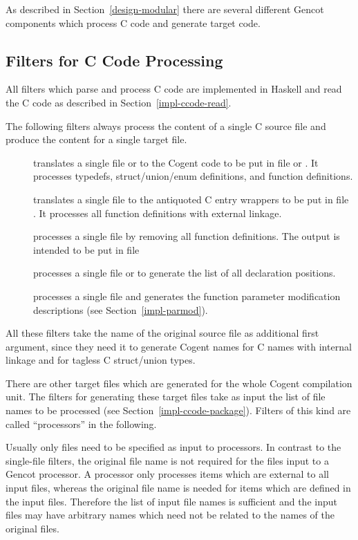 As described in Section~\ref{design-modular} there are several different Gencot components which process C code and generate 
target code.

\subsection{Filters for C Code Processing}
\label{impl-ccomps-filters}

All filters which parse and process C code are implemented in Haskell and read the
C code as described in Section~\ref{impl-ccode-read}.

The following filters always process the content of a single C source file and produce the content for a single 
target file.
\begin{description}
\item[] translates a single file  or  to the Cogent code to be put in file
 or . It processes typedefs, struct/union/enum definitions, and function
definitions. 
\item[] translates a single file  to the antiquoted C entry wrappers to be put in
file . It processes all function definitions with external linkage.
\item[] processes a single file  by removing all function definitions. The output
is intended to be put in file 
\item[] processes a single file  or  to generate the list of
all declaration positions.
\item[] processes a single file  and generates the 
function parameter modification descriptions (see Section~\ref{impl-parmod}).
\end{description}

All these filters take the name of the original source file as additional first
argument, since they need it to generate Cogent names for C names with internal linkage and for tagless C struct/union
types.

There are other target files which are generated for the whole Cogent compilation unit. The filters for generating these target files 
take as input the list of file names to be processed (see Section~\ref{impl-ccode-package}). Filters of this kind 
are called ``processors'' in the following.

Usually only  files need to be specified as input to processors.
In contrast to the single-file filters, the original file name is not required for the files input to a 
Gencot processor. A processor only processes items which are external to all input files, whereas the original
file name is needed for items which are defined in the input files. Therefore the list of input file names is
sufficient and the input files may have arbitrary names which need not be related to the names of the original 
 files.

